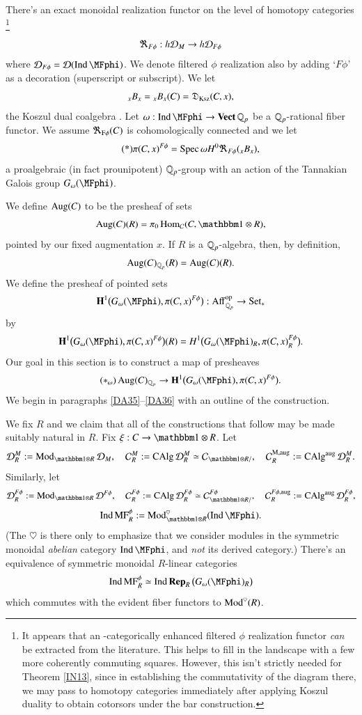 \sspar{}
\label{DA33}
There's an exact monoidal realization functor on the level of homotopy categories
\footnote{It appears that an \oo-categorically enhanced filtered $\phi$ realization functor \textit{can} be extracted from the literature. This helps to fill in the landscape with a few more coherently commuting squares. However, this isn't strictly needed for Theorem \ref{IN13}, since in establishing the commutativity of the diagram there, we may pass to homotopy categories immediately after applying Koszul duality to obtain cotorsors under the bar construction.}
\[
\Re_{F\phi}: h\mathcal{D}_M \to h\mathcal{D}_{F\phi}
\]
where $\Dd_{F\phi} = \Dd(\Ind \MFphi)$. We denote filtered $\phi$ realization also by adding `$F\phi$' as a decoration (superscript or subscript). We let 
\[
{_xB_x} = {_xB_x}(C) = \mathfrak{D}_{\mathrm{Ksz}}(C, x),
\]
the Koszul dual coalgebra \cite[\S 5.2.2]{LurieHA}. Let $\om: \Ind \MFphi \to \Vect \Qp$ be a ${\mathbb{Q}_p}$-rational fiber functor. We assume $\Re_{{\mathrm{F}\phi}}(C)$ is cohomologically connected and we let
\[
\tag{*}
\pi(C,x)^{F\phi} = \operatorname{Spec} \omega H^0 \Re_{F\phi} ({_xB_x} ),
\]
a proalgebraic (in fact prounipotent) ${\mathbb{Q}_p}$-group with an action of the Tannakian Galois group $G_\om(\MFphi)$. 


\sspar{}\label{DA34}
We define $\operatorname{Aug}(C)$ to be the presheaf of sets
\[
\Aug(C)(R) = \pi_0 \Hom_{\Cc}(C, \one \otimes R),
\]
pointed by our fixed augmentation $x$. If $R$ is a ${\mathbb{Q}_p}$-algebra, then, by definition, 
\[
\operatorname{Aug}(C)_{\mathbb{Q}_p}(R) = \operatorname{Aug}(C)(R).
\]
We define the presheaf of pointed sets
\[
\mathbf{H}^1\big(G_\om(\MFphi), \pi(C,x)^{F\phi}\big)
:
\m{Aff}^\m{op}_\Qp \to \Set_*
\]
by
\[
\mathbf{H}^1\big(G_\om(\MFphi), \pi(C,x)^{F\phi}\big)(R) = 
H^1\big(G_\om(\MFphi)_R, \pi(C,x)^{F\phi}_R\big).
\]
Our goal in this section is to construct a map of presheaves
\[
\tag{$\ast_\om$}
\Aug(C)_{\Qp} \to \mathbf{H}^1\big(G_\om(\MFphi), \pi(C,x)^{F\phi}\big).
\]
We begin in paragraphs \ref{DA35}--\ref{DA36} with an outline of the construction.

\sspar{}\label{DA35}
We fix $R$ and we claim that all of the constructions that follow may be made suitably natural in $R$. Fix $\xi : C \to \one \otimes R$. Let
\[
\Dd^M_R:= \Mod_{\one \otimes R}\Dd_M,
\quad 
\Cc^M_R := \CAlg \Dd^M_R \simeq \Cc_{\one \otimes R/}, 
\quad
\Cc_R^\m{M,aug} := \CAlg^\m{aug} \Dd^M_R.
\]
Similarly, let
\[
\Dd^{F\phi}_R:= \Mod_{\one \otimes R}\Dd^{F\phi},
\quad 
\Cc^{F\phi}_R := \CAlg \Dd^{F\phi}_R \simeq \Cc^{F\phi}_{\one \otimes R/}, 
\quad
\Cc_R^{F\phi,\m{aug}} := \CAlg^\m{aug} \Dd^{F\phi}_R,
\]
\[
\Ind \opnm{MF}^\phi_R := \Mod_{\one \otimes R}^\heartsuit (\Ind\MFphi).
\]
(The $\heartsuit$ is there only to emphasize that we consider modules in the symmetric monoidal \textit{abelian} category $\Ind \MFphi$, and \textit{not} its derived category.) There's an equivalence of symmetric monoidal $R$-linear categories
\[
\Ind\opnm{MF}^\phi_R 
\simeq 
\Ind\Rep_R \big(G_\om(\MFphi)_R\big)
\]
which commutes with the evident fiber functors to $\operatorname{Mod}^\heartsuit(R)$. 


